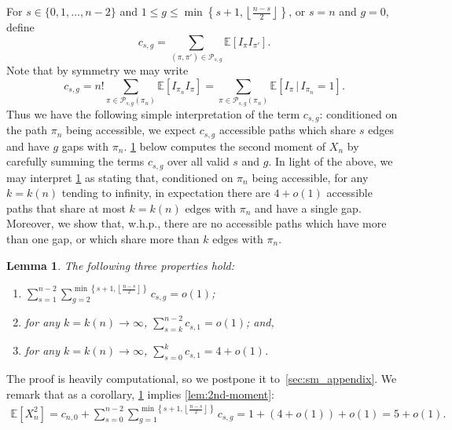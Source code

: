 \documentclass[11pt]{article}
\newtheorem{lemma}[theorem]{Lemma}
\theoremstyle{definition}
\theoremstyle{remark}
\theoremstyle{remark}
\numberwithin{theorem}{section}
\newcommand{\E}{\mathbb{E}}
\newcommand{\ds}{\displaystyle}
\begin{document}
For $s \in \{0,1,\dots,n-2\}$ and $1 \leq g \leq\min\left\{s+1, \left\lfloor \frac{n-s}{2}\right\rfloor \right\}$, or $s = n$ and $g = 0$, define
\begin{equation}\label{eq:csg}
    c_{s,g} = \sum_{(\pi,\pi') \in \mathcal{P}_{s,g}}\E[I_{\pi}I_{\pi'}].
\end{equation}
Note that by symmetry we may write 
\begin{equation}\label{eq:sm_exp3}
    c_{s,g} = n!\sum_{\pi \in \mathcal{P}_{s,g}(\pi_{n})}\E[I_{\pi_{n}}I_{\pi}] = \sum_{\pi \in \mathcal{P}_{s,g}(\pi_{n})}\E[I_{\pi}\,|\,I_{\pi_{n}} = 1].
\end{equation}
Thus we have the following simple interpretation of the term $c_{s,g}$: conditioned on the path $\pi_{n}$ being accessible, we expect $c_{s,g}$ accessible paths which share $s$ edges and have $g$ gaps with $\pi_{n}$. \cref{lem:pair_sums} below computes the second moment of $X_n$ by carefully summing the terms $c_{s,g}$ over all valid $s$ and $g$. In light of the above, we may interpret \cref{lem:pair_sums} as stating that, conditioned on $\pi_{n}$ being accessible, for any $k = k(n)$ tending to infinity, in expectation there are $4 + o(1)$ accessible paths that share at most $k = k(n)$ edges with $\pi_{n}$ and have a single gap. Moreover, we show that, w.h.p., there are no accessible paths which have more than one gap, or which share more than $k$ edges with $\pi_{n}$.

\begin{lemma}\label{lem:pair_sums}
	The following three properties hold:
	\begin{enumerate}
		\item $\ds\sum_{s=1}^{n-2}\sum_{g=2}^{\min\left\{s+1, \left\lfloor\frac{n-s}{2}\right\rfloor \right\}}c_{s,g} = o(1)$;
		\item for any $k = k(n) \to \infty$, $\ds\sum_{s=k}^{n-2}c_{s,1} = o(1)$; and,
		\item for any $k = k(n) \to \infty$, $\ds\sum_{s=0}^{k}c_{s,1} = 4 + o(1)$.
	\end{enumerate}
\end{lemma}

The proof is heavily computational, so we postpone it to~\cref{sec:sm_appendix}. We remark that as a corollary, \cref{lem:pair_sums} implies \cref{lem:2nd-moment}: 
\begin{align*}
	\E[X_n^{2}] = c_{n,0} + \sum_{s=0}^{n-2}\sum_{g=1}^{\min\left\{s+1,\left\lfloor\frac{n-s}{2}\right\rfloor \right\}}c_{s,g} 
	= 1 + (4 + o(1)) + o(1) = 5 + o(1).
\end{align*}
\end{document}
